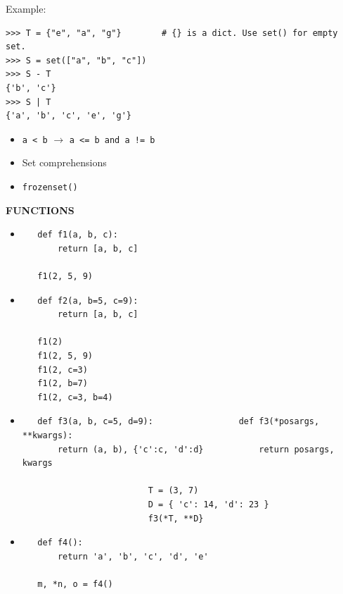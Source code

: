 \documentclass[9pt,a4wide]{extarticle}
\begin{document}
\bigskip

Example:

\begin{verbatim}
>>> T = {"e", "a", "g"}        # {} is a dict. Use set() for empty set.
>>> S = set(["a", "b", "c"])   
>>> S - T 
{'b', 'c'}
>>> S | T
{'a', 'b', 'c', 'e', 'g'}
\end{verbatim}

\begin{itemize}
\item {\tt a < b} $\rightarrow$ {\tt a <= b and a != b}
\item Set comprehensions
\item {\tt frozenset()}
\end{itemize}




\bigskip
{\LARGE\bf FUNCTIONS}
{}

\begin{itemize}

\item 

   \begin{verbatim}
   def f1(a, b, c):
       return [a, b, c]

   f1(2, 5, 9)
   \end{verbatim}

\item

   \begin{verbatim}
   def f2(a, b=5, c=9):
       return [a, b, c]

   f1(2)
   f1(2, 5, 9)
   f1(2, c=3)
   f1(2, b=7)
   f1(2, c=3, b=4)
   \end{verbatim}

\item 

   \begin{verbatim}
   def f3(a, b, c=5, d=9):                 def f3(*posargs, **kwargs):
       return (a, b), {'c':c, 'd':d}           return posargs, kwargs

                         T = (3, 7)
                         D = { 'c': 14, 'd': 23 }
                         f3(*T, **D}
   \end{verbatim}

\item 

   \begin{verbatim}
   def f4():
       return 'a', 'b', 'c', 'd', 'e'

   m, *n, o = f4()
   \end{verbatim}

\end{itemize}
\end{document}
